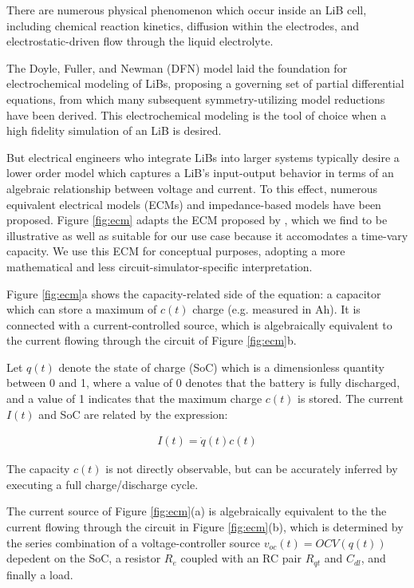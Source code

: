 \documentclass[conference]{IEEEtran}
\begin{document}
There are numerous physical phenomenon which occur inside an LiB cell,
including chemical reaction kinetics, diffusion within the electrodes,
and electrostatic-driven flow through the liquid electrolyte.

The Doyle, Fuller, and Newman (DFN) model \cite{doyle_modeling_1993} laid the foundation
for electrochemical modeling of LiBs, proposing a governing set of
partial differential equations, from which many subsequent symmetry-utilizing
model reductions have been derived. This electrochemical modeling
is the tool of choice when a high fidelity simulation of an LiB
is desired. 

But electrical engineers who integrate LiBs into larger systems
typically desire a lower order model which captures a LiB's input-output
behavior in terms of an algebraic relationship between voltage and current.
To this effect, numerous equivalent electrical models (ECMs) and
impedance-based models have been proposed. Figure \ref{fig:ecm} adapts the
ECM proposed by \cite{chen_accurate_2006}, which we find to be illustrative
as well as suitable for our use case because it accomodates a time-vary capacity.
We use this ECM for conceptual purposes, adopting a more mathematical
and less circuit-simulator-specific interpretation.

Figure \ref{fig:ecm}a shows the capacity-related side of the equation: a
capacitor which can store a maximum of $c(t)$ charge (e.g. measured in Ah).
It is connected with a current-controlled source, which is algebraically
equivalent to the current flowing through the circuit of Figure \ref{fig:ecm}b.

Let $q(t)$ denote the state of charge (SoC) which is a dimensionless
quantity between 0 and 1, where a value of 0 denotes that the battery
is fully discharged, and a value of 1 indicates that the maximum charge 
$c(t)$ is stored. The current $I(t)$ and SoC are
related by the expression:

\begin{align*}
    I(t) = \dot{q}(t) c(t)
\end{align*}

The capacity $c(t)$ is not directly observable, but can be accurately
inferred by executing a full charge/discharge cycle.

The current source of Figure \ref{fig:ecm}(a) is algebraically equivalent to the
the current flowing through the circuit in Figure \ref{fig:ecm}(b), which is
determined by the series combination of a voltage-controller source
$v_{oc}(t) = OCV(q(t))$ depedent on the SoC, a resistor $R_e$ coupled with an RC
pair $R_{qt}$ and $C_{dl}$, and finally a load.
\end{document}
